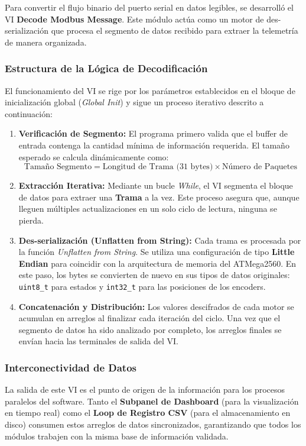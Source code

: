Para convertir el flujo binario del puerto serial en datos legibles, se desarrolló el VI \textbf{Decode Modbus Message}. Este módulo actúa como un motor de des-serialización que procesa el segmento de datos recibido para extraer la telemetría de manera organizada.

\subsubsection{Estructura de la Lógica de Decodificación}
El funcionamiento del VI se rige por los parámetros establecidos en el bloque de inicialización global (\textit{Global Init}) y sigue un proceso iterativo descrito a continuación:

\begin{enumerate}
	\item \textbf{Verificación de Segmento:} El programa primero valida que el buffer de entrada contenga la cantidad mínima de información requerida. El tamaño esperado se calcula dinámicamente como:
	\[ \text{Tamaño Segmento} = \text{Longitud de Trama (31 bytes)} \times \text{Número de Paquetes} \]
	
	\item \textbf{Extracción Iterativa:} Mediante un bucle \textit{While}, el VI segmenta el bloque de datos para extraer una \textbf{Trama} a la vez. Este proceso asegura que, aunque lleguen múltiples actualizaciones en un solo ciclo de lectura, ninguna se pierda.
	
	\item \textbf{Des-serialización (Unflatten from String):} Cada trama es procesada por la función \textit{Unflatten from String}. Se utiliza una configuración de tipo \textbf{Little Endian} para coincidir con la arquitectura de memoria del ATMega2560. En este paso, los bytes se convierten de nuevo en sus tipos de datos originales: \texttt{uint8\_t} para estados y \texttt{int32\_t} para las posiciones de los encoders.
	
	\item \textbf{Concatenación y Distribución:} Los valores descifrados de cada motor se acumulan en arreglos al finalizar cada iteración del ciclo. Una vez que el segmento de datos ha sido analizado por completo, los arreglos finales se envían hacia las terminales de salida del VI.
\end{enumerate}

\subsubsection{Interconectividad de Datos}
La salida de este VI es el punto de origen de la información para los procesos paralelos del software. Tanto el \textbf{Subpanel de Dashboard} (para la visualización en tiempo real) como el \textbf{Loop de Registro CSV} (para el almacenamiento en disco) consumen estos arreglos de datos sincronizados, garantizando que todos los módulos trabajen con la misma base de información validada.



